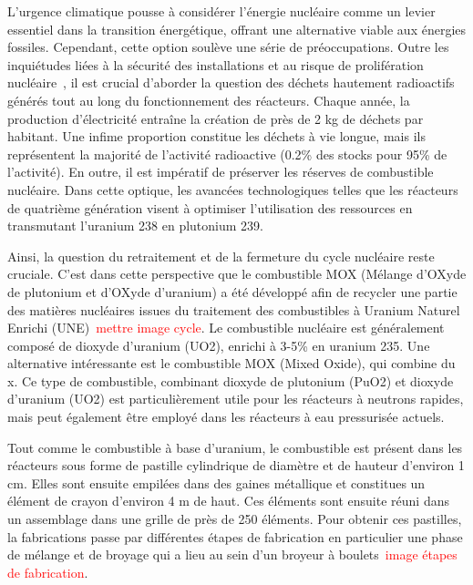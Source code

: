 L'urgence climatique pousse à considérer l'énergie nucléaire comme un levier essentiel dans la transition énergétique, offrant une alternative viable aux énergies fossiles. Cependant, cette option soulève une série de préoccupations. Outre les inquiétudes liées à la sécurité des installations et au risque de prolifération nucléaire~\cite{npt_resolution}, il est crucial d'aborder la question des déchets hautement radioactifs générés tout au long du fonctionnement des réacteurs. Chaque année, la production d'électricité entraîne la création de près de 2 kg de déchets par habitant. Une infime proportion constitue les déchets à vie longue, mais ils représentent la majorité de l'activité radioactive (0.2\% des stocks pour 95\% de l'activité). En outre, il est impératif de préserver les réserves de combustible nucléaire. Dans cette optique, les avancées technologiques telles que les réacteurs de quatrième génération visent à optimiser l'utilisation des ressources en transmutant l'uranium 238 en plutonium 239.

Ainsi, la question du retraitement et de la fermeture du cycle nucléaire reste cruciale. C'est dans cette perspective que le combustible MOX (Mélange d’OXyde de plutonium et d’OXyde d’uranium) a été développé afin de recycler une partie des matières nucléaires issues du traitement des combustibles à Uranium Naturel Enrichi (UNE)~\textcolor{red}{mettre image cycle}.
Le combustible nucléaire est généralement composé de dioxyde d'uranium (UO2), enrichi à 3-5\% en uranium 235. Une alternative intéressante est le combustible MOX (Mixed Oxide), qui combine du x.
Ce type de combustible, combinant dioxyde de plutonium (PuO2) et dioxyde d'uranium (UO2) est particulièrement utile pour les réacteurs à neutrons rapides, mais peut également être employé dans les réacteurs à eau pressurisée actuels.


Tout comme le combustible à base d'uranium, le combustible est présent dans les réacteurs sous forme de pastille cylindrique de diamètre et de hauteur d'environ 1 cm. Elles sont ensuite empilées dans des gaines métallique et constitues un élément de crayon d'environ 4 m de haut. Ces éléments sont ensuite réuni dans un assemblage dans une grille de près de 250 éléments. Pour obtenir ces pastilles, la fabrications passe par différentes étapes de fabrication en particulier une phase de mélange et de broyage qui a lieu au sein d'un broyeur à boulets~\textcolor{red}{image étapes de fabrication}.

